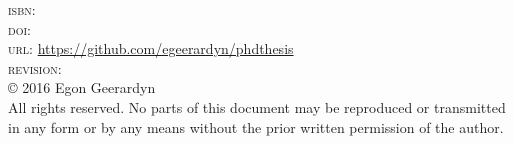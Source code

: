 \thispagestyle{empty}
\begin{bottompar}

\textsc{isbn:} \\
\textsc{doi:} \\
\textsc{url:} \url{https://github.com/egeerardyn/phdthesis}\\
\textsc{revision:} \texttt{\VCRevision}\\

\copyright{} 2016 Egon Geerardyn\\

All rights reserved. No parts of this document may be reproduced or transmitted in any form or by any means without the prior written permission of the author.


\end{bottompar}
